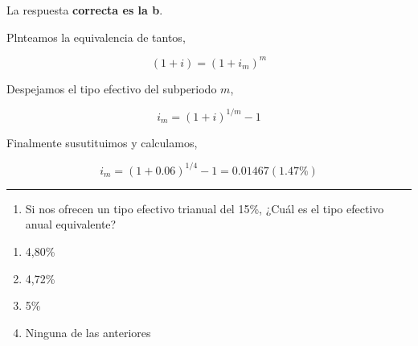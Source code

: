 \documentclass[
  letterpaper,
  DIV=11,
  numbers=noendperiod]{scrreprt}
\providecommand{\tightlist}{%
  \setlength{\itemsep}{0pt}\setlength{\parskip}{0pt}}\usepackage{longtable,booktabs,array}
\begin{document}
\begin{tcolorbox}[enhanced jigsaw, left=2mm, opacityback=0, colback=white, breakable, arc=.35mm, bottomrule=.15mm, rightrule=.15mm, toprule=.15mm, leftrule=.75mm, colframe=quarto-callout-tip-color-frame]
\begin{minipage}[t]{5.5mm}
\textcolor{quarto-callout-tip-color}{\faLightbulb}
\end{minipage}%
\begin{minipage}[t]{\textwidth - 5.5mm}

La respuesta \textbf{correcta es la b}.

Plnteamos la equivalencia de tantos,

\[\left(1+i\right)=\left(1+i_m\right)^m\]

Despejamos el tipo efectivo del subperiodo \(m\),

\[i_m=\left(1+i\right)^{1/m}-1\]

Finalmente susutituimos y calculamos,

\[i_m=\left(1+0.06\right)^{1/4}-1=0.01467(1.47\%)\]

\end{minipage}%
\end{tcolorbox}

\begin{center}\rule{0.5\linewidth}{0.5pt}\end{center}

\begin{enumerate}
\def\labelenumi{\arabic{enumi}.}
\setcounter{enumi}{23}
\tightlist
\item
  Si nos ofrecen un tipo efectivo trianual del 15\%, ¿Cuál es el tipo
  efectivo anual equivalente?
\end{enumerate}

\begin{enumerate}
\def\labelenumi{\alph{enumi})}
\item
  4,80\%
\item
  4,72\%
\item
  5\%
\item
  Ninguna de las anteriores
\end{enumerate}
\end{document}
